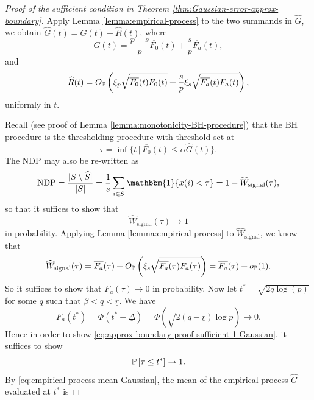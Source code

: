 \begin{proof}[Proof of the sufficient condition in Theorem \ref{thm:Gaussian-error-approx-boundary}]
Apply Lemma \ref{lemma:empirical-process} to the two summands in $\widehat{G}$, we obtain
$\widehat{G}(t) = G(t) + \widehat{R}(t)$,
where 
\begin{equation} \label{eq:empirical-process-mean-Gaussian}
    G(t) = \frac{p-s}{p}\overline{F_0}(t) + \frac{s}{p}\overline{F_a}(t),
\end{equation}
and 
\begin{equation} \label{eq:empirical-process-residual-Gaussian}
    \widehat{R}(t) = O_\P\left(\xi_p\sqrt{\overline{F_0}(t)F_0(t)} + \frac{s}{p}\xi_s\sqrt{\overline{F_a}(t)F_a(t)}\right),
\end{equation}
uniformly in $t$.

Recall (see proof of Lemma \ref{lemma:monotonicity-BH-procedure}) that the BH procedure is the thresholding procedure with threshold set at 
\begin{equation} \label{eq:approx-boundary-proof-tau-Gaussian}
    \tau = \inf\{t\,|\,\overline{F_0}(t)\le\alpha\widehat{G}(t)\}. 
\end{equation}
The NDP may also be re-written as 
$$
\text{NDP} = \frac{|{S}\setminus\widehat{S}|}{|{S}|} = \frac{1}{s}\sum_{i\in S}\mathbbm{1}\{x(i) < \tau\} = 1 - \widehat{W}_\text{signal}(\tau),
$$
so that it suffices to show that 
\begin{equation} \label{eq:approx-boundary-proof-sufficient-1-Gaussian}
    \widehat{W}_\text{signal}(\tau)\to 1
\end{equation} in probability.
Applying Lemma \ref{lemma:empirical-process} to $\widehat{W}_\text{signal}$, we know that 
$$
\widehat{W}_\text{signal}(\tau) = \overline{F_a}(\tau) + O_\P\left(\xi_s\sqrt{\overline{F_a}(\tau)F_a(\tau)}\right) = \overline{F_a}(\tau) + o_\P(1).
$$
So it suffices to show that $F_a(\tau)\to 0$ in probability.
Now let $t^* = \sqrt{2q\log(p)}$ for some $q$ such that $\beta<q<\underline{r}$.
We have 
\begin{equation} \label{eq:approx-boundary-proof-sufficient-2-Gaussian}
    F_a(t^*) 
    = \Phi(t^* - \underline{\Delta}) 
    = \Phi(\sqrt{2(q - \underline{r})\log{p}}) \to 0. 
\end{equation}
Hence in order to show \eqref{eq:approx-boundary-proof-sufficient-1-Gaussian}, it suffices to show 
\begin{equation} \label{eq:approx-boundary-proof-sufficient-3-Gaussian}
    \P\left[\tau \le t^*\right] \to 1.
\end{equation}
By \eqref{eq:empirical-process-mean-Gaussian}, the mean of the empirical process $\widehat{G}$ evaluated at $t^*$ is

\end{proof}
